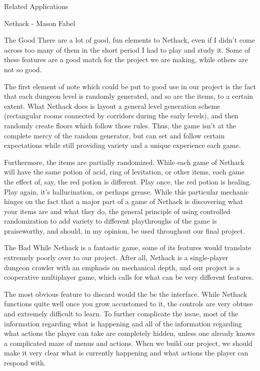 \documentclass[12pt]{report}
\begin{document}
\begin{section}{Related Applications}
\begin{subsection}{Nethack - Mason Fabel}
\begin{subsubsection}{The Good}
There are a lot of good, fun elements to Nethack, even if I didn't come
across too many of them in the short period I had to play and study it.
Some of these features are a good match for the project we are making,
while others are not so good.

The first element of note which could be put to good use in our project
is the fact that each dungeon level is randomly generated, and so are
the items, to a certain extent. What Nethack does is layout a general
level generation scheme (rectangular rooms connected by corridors during
the early levels), and then randomly create floors which follow those
rules. Thus, the game isn't at the complete mercy of the random generator,
but can set and follow certain expectations while still providing variety
and a unique experience each game.

Furthermore, the items are partially randomized. While each game of
Nethack will have the same potion of acid, ring of levitation, or other
items, each game the effect of, say, the red potion is different.
Play once, the red potion is healing. Play again, it's hallucination, or
perhaps grease. While this particular mechanic hinges on the fact that a
major part of a game of Nethack is discovering what your items are and
what they do, the general principle of using controlled randomization to
add variety to different playthroughs of the game is praiseworthy, and
should, in my opinion, be used throughout our final project.
\end{subsubsection}

\begin{subsubsection}{The Bad}
While Nethack is a fantastic game, some of its features would translate
extremely poorly over to our project. After all, Nethack is a single-player
dungeon crawler with an emphasis on mechanical depth, and our project
is a cooperative multiplayer game, which calls for what can be very
different features.

The most obvious feature to discard would the be the interface. While
Nethack functions quite well once you grow accustomed to it, the controls
are very obtuse and extremely difficult to learn. To further complicate
the issue, most of the information regarding what is happening and all of
the information regarding what actions the player can take are completely
hidden, unless one already knows a complicated maze of menus and actions.
When we build our project, we should make it very clear what is currently
happening and what actions the player can respond with.


\end{subsubsection}
\end{subsection}
\end{section}
\end{document}
